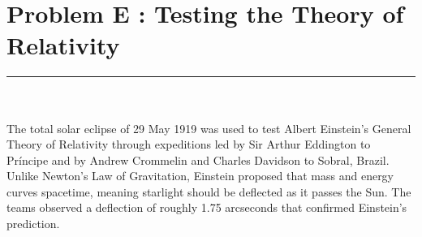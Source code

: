 \documentclass{article}
\begin{document}
\section*{Problem E : Testing the Theory of Relativity}
\vspace{-10pt} \textcolor{cyan}{\rule{11.5cm}{0.6pt}}\\\\
The total solar eclipse of 29 May 1919 was used to test Albert Einstein’s General Theory of Relativity through expeditions led by Sir Arthur Eddington to Príncipe and by Andrew Crommelin and Charles Davidson to Sobral, Brazil. Unlike Newton's Law of Gravitation, Einstein proposed that mass and energy curves spacetime, meaning starlight should be deflected as it passes the Sun. The teams observed a deflection of roughly 1.75 arcseconds that confirmed Einstein’s prediction.
\end{document}
